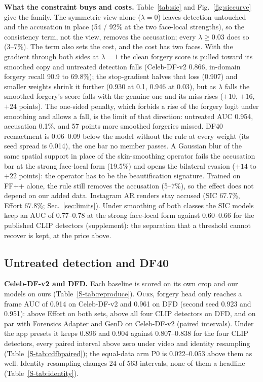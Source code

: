 \documentclass[conference]{IEEEtran}
\newcommand{\oursB}{\textsc{Ours}, forgery head only}
\begin{document}
\textbf{What the constraint buys and costs.} Table~\ref{tab:sic} and Fig.~\ref{fig:siccurve} give the family. The
symmetric view alone ($\lambda=0$) leaves detection untouched and the accusation in place (54 / 92\% at the two face-local
strengths), so the consistency term, not the view, removes the accusation; every $\lambda\ge0.03$ does so (3--7\%). The term
also sets the cost, and the cost has two faces. With the gradient through both sides at $\lambda=1$ the clean forgery score is
pulled toward its smoothed copy and untreated detection falls (Celeb-DF-v2 0.866, in-domain forgery recall 90.9 to 69.8\%);
the stop-gradient halves that loss (0.907) and smaller weights shrink it further (0.930 at 0.1, 0.946 at 0.03), but as
$\lambda$ falls the smoothed forgery's score falls with the genuine one and its miss rises ($+10$, $+16$, $+24$ points). The
one-sided penalty, which forbids a rise of the forgery logit under smoothing and allows a fall, is the limit of that
direction: untreated AUC 0.954, accusation 0.1\%, and 57 points more smoothed forgeries missed. DF40 reenactment is 0.06--0.09
below the model without the rule at every weight (its seed spread is 0.014), the one bar no member passes. A Gaussian blur
of the same spatial support in place of the skin-smoothing operator fails the accusation bar at the strong face-local form
(19.5\%) and opens the bilateral evasion ($+14$ to $+22$ points): the operator has to be the beautification signature.
Trained on FF++ alone, the rule still removes the accusation (5--7\%), so the effect does not depend on our added data.
Instagram AR renders stay accused (SIC 67.7\%, Effort 67.8\%; Sec.~\ref{sec:limits}). Under smoothing of both classes the SIC
models keep an AUC of 0.77--0.78 at the strong face-local form against 0.60--0.66 for the published CLIP detectors
(supplement): the separation that a threshold cannot recover is kept, at the price above.

\subsection{Untreated detection and DF40}
\label{sec:detect}
\textbf{Celeb-DF-v2 and DFD.} Each baseline is scored on its own crop and our models on ours (Table~\ref{S-tab:reproduce}).
\oursB{} reaches a frame AUC of 0.914 on Celeb-DF-v2 and 0.961 on DFD (second seed 0.923 and 0.951): above Effort on both
sets, above all four CLIP detectors on DFD, and on par with Forensics Adapter and GenD on Celeb-DF-v2 (paired intervals). Under
the app presets it keeps 0.896 and 0.904 against 0.807--0.838 for the four CLIP detectors, every paired interval above zero
under video and identity resampling (Table~\ref{S-tab:cdfbpaired}); the equal-data arm P0 is 0.022--0.053 above them as well.
Identity resampling changes 24 of 563 intervals, none of them a headline (Table~\ref{S-tab:identity}).
\end{document}
